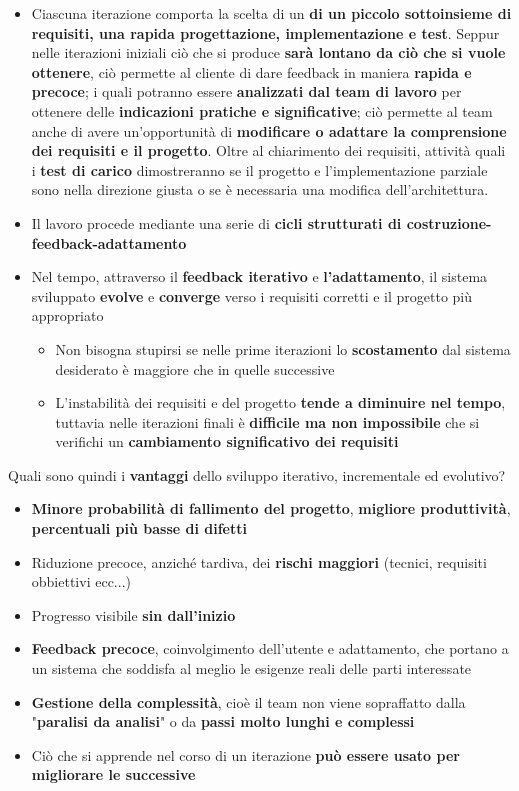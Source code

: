 \documentclass[12pt]{article}
\begin{document}
\begin{itemize}
    \item Ciascuna iterazione comporta la scelta di un \textbf{di un piccolo sottoinsieme di requisiti, una rapida progettazione, implementazione e test}.
    Seppur nelle iterazioni iniziali ciò che si produce \textbf{sarà lontano da ciò che si vuole ottenere}, ciò permette al cliente di dare feedback in maniera \textbf{rapida e precoce}; i quali potranno essere \textbf{analizzati dal team di lavoro} per ottenere delle \textbf{indicazioni pratiche e significative}; ciò permette al team anche di avere un'opportunità di \textbf{modificare o adattare la comprensione dei requisiti e il progetto}.
    Oltre al chiarimento dei requisiti, attività quali i \textbf{test di carico} dimostreranno se il progetto e l'implementazione parziale sono nella direzione giusta o se è necessaria una modifica dell'architettura.
    \item Il lavoro procede mediante una serie di \textbf{cicli strutturati di costruzione-feedback-adattamento}
    \item Nel tempo, attraverso il \textbf{feedback iterativo} e \textbf{l'adattamento}, il sistema sviluppato \textbf{evolve} e \textbf{converge} verso i requisiti corretti e il progetto più appropriato
    \begin{itemize}
        \item Non bisogna stupirsi se nelle prime iterazioni lo \textbf{scostamento} dal sistema desiderato è maggiore che in quelle successive
        \item L'instabilità dei requisiti e del progetto \textbf{tende a diminuire nel tempo}, tuttavia nelle iterazioni finali è \textbf{difficile ma non impossibile} che si verifichi un \textbf{cambiamento significativo dei requisiti}
    \end{itemize}
\end{itemize}
Quali sono quindi i \textbf{vantaggi} dello sviluppo iterativo, incrementale ed evolutivo?
\begin{itemize}
    \item \textbf{Minore probabilità di fallimento del progetto}, \textbf{migliore produttività}, \textbf{percentuali più basse di difetti}
    \item Riduzione precoce, anziché tardiva, dei \textbf{rischi maggiori} (tecnici, requisiti obbiettivi ecc...)
    \item Progresso visibile \textbf{sin dall'inizio}
    \item \textbf{Feedback precoce}, coinvolgimento dell'utente e adattamento, che portano a un sistema che soddisfa al meglio le esigenze reali delle parti interessate
    \item \textbf{Gestione della complessità}, cioè il team non viene sopraffatto dalla "\textbf{paralisi da analisi}" o da \textbf{passi molto lunghi e complessi}
    \item Ciò che si apprende nel corso di un iterazione \textbf{può essere usato per migliorare le successive}
\end{itemize}
\end{document}
